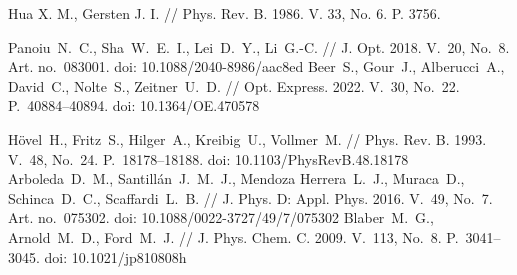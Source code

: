 \documentclass[12pt, a4paper]{article}
\begin{document}
\begin{thebibliography}{99}
Hua X. M., Gersten J. I. // Phys. Rev. B. 1986. V. 33, No. 6. P. 3756.


Panoiu~N.~C., Sha~W.~E.~I., Lei~D.~Y., Li~G.-C. // J. Opt. 2018. V.~20, No.~8. Art. no.~083001. doi: 10.1088/2040-8986/aac8ed
Beer~S., Gour~J., Alberucci~A., David~C., Nolte~S., Zeitner~U.~D. // Opt. Express. 2022. V.~30, No.~22. P.~40884--40894. doi: 10.1364/OE.470578

H\"{o}vel~H., Fritz~S., Hilger~A., Kreibig~U., Vollmer~M. // Phys. Rev. B. 1993. V.~48, No.~24. P.~18178--18188. doi: 10.1103/PhysRevB.48.18178
Arboleda~D.~M., Santillán~J.~M.~J., Mendoza Herrera~L.~J., Muraca~D., Schinca~D.~C., Scaffardi~L.~B. // J. Phys. D: Appl. Phys. 2016. V.~49, No.~7. Art. no.~075302. doi: 10.1088/0022-3727/49/7/075302
Blaber~M.~G., Arnold~M.~D., Ford~M.~J. // J. Phys. Chem. C. 2009. V.~113, No.~8. P.~3041--3045. doi: 10.1021/jp810808h
\end{thebibliography}

\newpage
\end{document}
